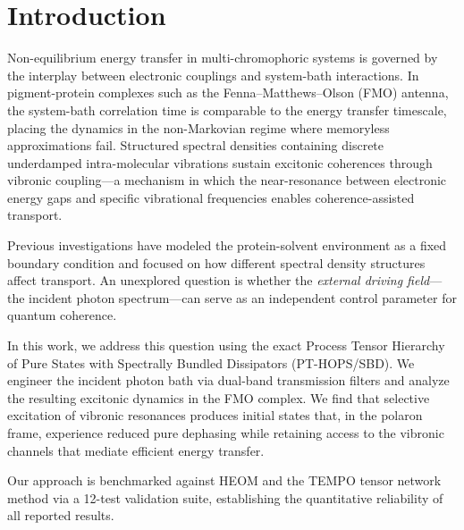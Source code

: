 \documentclass[aip,jcp,preprint]{revtex4-2}
\begin{document}
\maketitle

\section{\label{sec:intro}Introduction}

Non-equilibrium energy transfer in multi-chromophoric systems is governed by the interplay between electronic couplings and system-bath interactions.\cite{Scholes2011,Cao2020} In pigment-protein complexes such as the Fenna--Matthews--Olson (FMO) antenna,\cite{Adolphs2006} the system-bath correlation time is comparable to the energy transfer timescale, placing the dynamics in the non-Markovian regime where memoryless approximations fail.\cite{Tanimura1989,Engel2007,Panitchayangkoon2010} Structured spectral densities containing discrete underdamped intra-molecular vibrations sustain excitonic coherences through vibronic coupling---a mechanism in which the near-resonance between electronic energy gaps and specific vibrational frequencies enables coherence-assisted transport.\cite{Ishizaki2009a,Christensson2012,Chin2013}

Previous investigations have modeled the protein-solvent environment as a fixed boundary condition and focused on how different spectral density structures affect transport.\cite{Huelga2013,Cao2020} An unexplored question is whether the \textit{external driving field}---the incident photon spectrum---can serve as an independent control parameter for quantum coherence.

In this work, we address this question using the exact Process Tensor Hierarchy of Pure States with Spectrally Bundled Dissipators (PT-HOPS/SBD).\cite{Suess2014,Citty2024a} We engineer the incident photon bath via dual-band transmission filters and analyze the resulting excitonic dynamics in the FMO complex. We find that selective excitation of vibronic resonances produces initial states that, in the polaron frame,\cite{Jang2008} experience reduced pure dephasing while retaining access to the vibronic channels that mediate efficient energy transfer.

Our approach is benchmarked against HEOM\cite{Tanimura1989,Ishizaki2009a} and the TEMPO tensor network method\cite{Strathearn2018} via a 12-test validation suite, establishing the quantitative reliability of all reported results.
\end{document}
